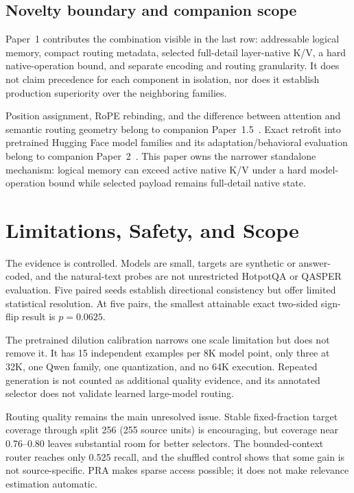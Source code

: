 \documentclass[11pt]{article}
\begin{document}
\subsection{Novelty boundary and companion scope}

Paper~1 contributes the combination visible in the last row: addressable logical memory,
compact routing metadata, selected full-detail layer-native K/V, a hard native-operation bound,
and separate encoding and routing granularity. It does not claim precedence for each component
in isolation, nor does it establish production superiority over the neighboring families.

Position assignment, RoPE rebinding, and the difference between attention and semantic routing
geometry belong to companion Paper~1.5~\cite{simao2026position}. Exact retrofit into pretrained
Hugging Face model families and its adaptation/behavioral evaluation belong to companion
Paper~2~\cite{simao2026hf}. This paper owns the narrower standalone mechanism: logical memory can
exceed active native K/V under a hard model-operation bound while selected payload remains
full-detail native state.

\section{Limitations, Safety, and Scope}
\label{sec:limitations}

The evidence is controlled. Models are small, targets are synthetic or answer-coded, and
the natural-text probes are not unrestricted HotpotQA or QASPER evaluation. Five paired
seeds establish directional consistency but offer limited statistical resolution. At five
pairs, the smallest attainable exact two-sided sign-flip result is $p=0.0625$.

The pretrained dilution calibration narrows one scale limitation but does not
remove it. It has 15 independent examples per 8K model point, only three at
32K, one Qwen family, one quantization, and no 64K execution. Repeated
generation is not counted as additional quality evidence, and its annotated
selector does not validate learned large-model routing.

Routing quality remains the main unresolved issue. Stable fixed-fraction target coverage
through split 256 (255 source units) is encouraging, but coverage near 0.76--0.80 leaves substantial room for
better selectors. The bounded-context router reaches only 0.525 recall, and the shuffled
control shows that some gain is not source-specific. PRA makes sparse access possible; it
does not make relevance estimation automatic.
\end{document}
